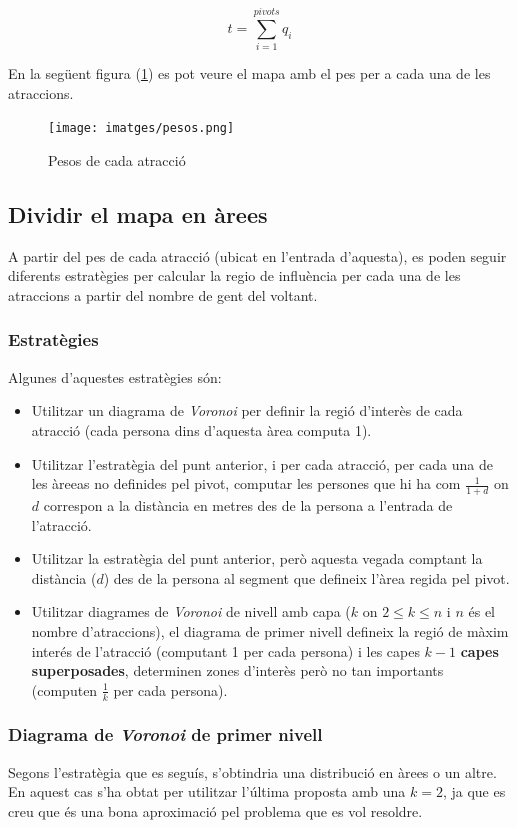 \documentclass[12pt]{article}
\begin{document}
\[t = \sum_{i=1}^{pivots}q_{i}\]

En la següent figura (\ref{fig:mapa_areas}) es pot veure el mapa amb el pes per a cada una de les atraccions.

\begin{figure}[H]
	\centering
	\texttt{[image: imatges/pesos.png]}\par\vspace{1cm}
	\caption{Pesos de cada atracció}
	\label{fig:mapa_areas}
\end{figure}

\subsection{Dividir el mapa en àrees \label{arees}}
A partir del pes de cada atracció (ubicat en l'entrada d'aquesta), es poden seguir diferents estratègies per calcular la regio de influència per cada una de les atraccions a partir del nombre de gent del voltant.

\subsubsection{Estratègies}
Algunes d'aquestes estratègies són:
\begin{itemize}
	\item Utilitzar un diagrama de \textit{Voronoi} per definir la regió d'interès de cada atracció (cada persona dins d'aquesta àrea computa 1).
	\item Utilitzar l'estratègia del punt anterior, i per cada atracció, per cada una de les àreeas no definides pel pivot, computar les persones que hi ha com $\frac{1}{1+d}$ on $d$ correspon a la distància en metres des de la persona a l'entrada de l'atracció.
	\item Utilitzar la estratègia del punt anterior, però aquesta vegada comptant la distància ($d$) des de la persona al segment que defineix l'àrea regida pel pivot.
	\item Utilitzar diagrames de \textit{Voronoi} de nivell amb capa ($k$ on $2 \le k \le n$ i $n$ és el nombre d'atraccions), el diagrama de primer nivell defineix la regió de màxim interés de l'atracció (computant 1 per cada persona) i les capes $k-1$ \textbf{capes superposades}, determinen zones d'interès però no tan importants (computen $\frac{1}{k}$ per cada persona).
\end{itemize}

\subsubsection{Diagrama de \textit{Voronoi} de primer nivell}
Segons l'estratègia que es seguís, s'obtindria una distribució en àrees o un altre. En aquest cas s'ha obtat per utilitzar l'última proposta amb una $k = 2$, ja que es creu que és una bona aproximació pel problema que es vol resoldre. 
\end{document}
